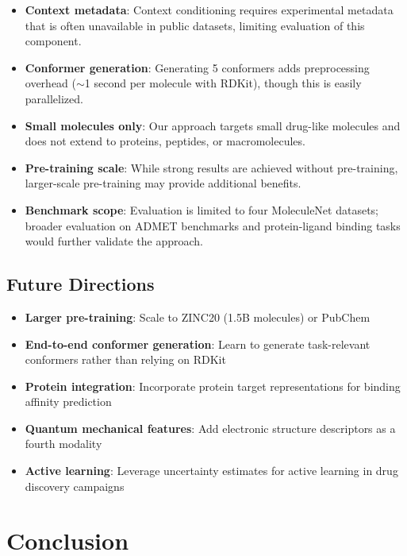 \documentclass[11pt]{article}
\begin{document}
\begin{itemize}[leftmargin=*,itemsep=2pt]
    \item \textbf{Context metadata}: Context conditioning requires experimental metadata that is often unavailable in public datasets, limiting evaluation of this component.
    \item \textbf{Conformer generation}: Generating 5 conformers adds preprocessing overhead ($\sim$1 second per molecule with RDKit), though this is easily parallelized.
    \item \textbf{Small molecules only}: Our approach targets small drug-like molecules and does not extend to proteins, peptides, or macromolecules.
    \item \textbf{Pre-training scale}: While strong results are achieved without pre-training, larger-scale pre-training may provide additional benefits.
    \item \textbf{Benchmark scope}: Evaluation is limited to four MoleculeNet datasets; broader evaluation on ADMET benchmarks and protein-ligand binding tasks would further validate the approach.
\end{itemize}

\subsection{Future Directions}

\begin{itemize}[leftmargin=*,itemsep=2pt]
    \item \textbf{Larger pre-training}: Scale to ZINC20 (1.5B molecules) or PubChem
    \item \textbf{End-to-end conformer generation}: Learn to generate task-relevant conformers rather than relying on RDKit
    \item \textbf{Protein integration}: Incorporate protein target representations for binding affinity prediction
    \item \textbf{Quantum mechanical features}: Add electronic structure descriptors as a fourth modality
    \item \textbf{Active learning}: Leverage uncertainty estimates for active learning in drug discovery campaigns
\end{itemize}

\section{Conclusion}
\label{sec:conclusion}
\end{document}
